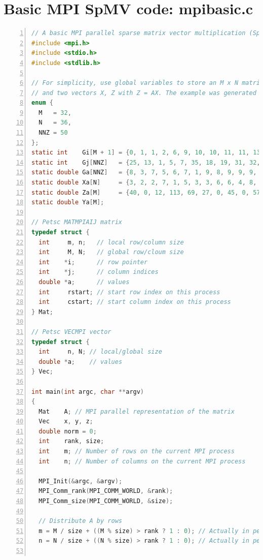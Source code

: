 \documentclass[creativecommons]{eptcs}
\begin{document}
\section{Basic MPI SpMV code: mpibasic.c}
\begin{lstlisting}[language=C, numbers=left]
// A basic MPI parallel sparse matrix vector multiplication (SpMV, MatMult in PETSc)
#include <mpi.h>
#include <stdio.h>
#include <stdlib.h>

// For simplicity, use global variables to store an M x N matrix A with NNZ nonzeros in the CSR format,
// and two vectors X, Z with Z = AX. The example was generated by the Python script crs.py
enum {
  M   = 32,
  N   = 36,
  NNZ = 50
};
static int    Gi[M + 1] = {0, 1, 1, 2, 6, 9, 10, 10, 11, 11, 13, 13, 13, 16, 17, 18, 18, 19, 20, 22, 23, 27, 28, 31, 32, 34, 37, 37, 41, 44, 44, 47, 49};
static int    Gj[NNZ]   = {25, 13, 1, 5, 7, 35, 18, 19, 31, 32, 21, 32, 33, 0, 8, 27, 16, 25, 3, 24, 17, 27, 13, 3, 28, 29, 30, 2, 23, 29, 31, 10, 8, 29, 1, 20, 22, 3, 8, 16, 19, 10, 14, 24, 2, 6, 15, 17, 34};
static double Ga[NNZ]   = {8, 3, 7, 5, 6, 7, 1, 9, 8, 9, 9, 9, 5, 1, 5, 8, 4, 4, 2, 11, 3, 8, 9, 7, 7, 4, 2, 2, 7, 6, 9, 3, 4, 2, 2, 9, 7, 4, 7, 8, 1, 8, 6, 1, 3, 3, 6, 6, 1};
static double Xa[N]     = {3, 2, 2, 7, 1, 5, 3, 3, 6, 6, 4, 8, 8, 4, 7, 8, 9, 7, 7, 6, 9, 5, 8, 5, 7, 5, 5, 5, 2, 4, 8, 1, 3, 6, 9, 8};
static double Za[M]     = {40, 0, 12, 113, 69, 27, 0, 45, 0, 57, 0, 0, 73, 36, 20, 0, 14, 77, 61, 36, 95, 4, 68, 12, 32, 141, 0, 148, 81, 0, 63, 51};
static double Ya[M];

// Petsc MATMPIAIJ matrix
typedef struct {
  int     m, n;   // local row/column size
  int     M, N;   // global row/cloum size
  int    *i;      // row pointer
  int    *j;      // column indices
  double *a;      // values
  int     rstart; // start row index on this process
  int     cstart; // start column index on this process
} Mat;

// Petsc VECMPI vector
typedef struct {
  int     n, N; // local/global size
  double *a;    // values
} Vec;

int main(int argc, char **argv)
{
  Mat    A; // MPI parallel representation of the matrix
  Vec    x, y, z;
  double norm = 0;
  int    rank, size;
  int    m; // Number of rows on the current MPI process
  int    n; // Number of columns on the current MPI process

  MPI_Init(&argc, &argv);
  MPI_Comm_rank(MPI_COMM_WORLD, &rank);
  MPI_Comm_size(MPI_COMM_WORLD, &size);

  // Distribute A by rows
  m = M / size + ((M % size) > rank ? 1 : 0); // Actually in petsc one can set m arbitrarily, as long as SUM(m) = M
  n = N / size + ((N % size) > rank ? 1 : 0); // Actually in petsc one can set n arbitrarily, as long as SUM(n) = N


\end{lstlisting}
\end{document}
